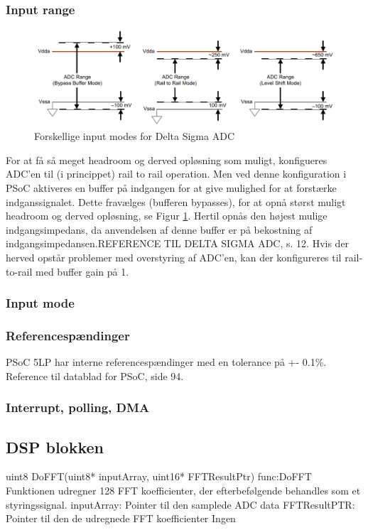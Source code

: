\subsubsection{Input range}
\begin{figure}
    \centering
    \includegraphics{figs/Design/Styringsenhed/inputrange.PNG}
    \caption{Forskellige input modes for Delta Sigma ADC}
    \label{fig:ADC_inputrange}
\end{figure}
For at få så meget headroom og derved opløsning som muligt, konfigueres ADC'en til (i princippet) rail to rail operation. Men ved denne konfiguration i PSoC aktiveres en buffer på indgangen for at give mulighed for at forstærke indganssignalet. Dette fravælges (bufferen bypasses), for at opnå størst muligt headroom og derved opløsning, se Figur \ref{fig:ADC_inputrange}. Hertil opnås den højest mulige indgangsimpedans,  da anvendelsen af denne buffer er på bekostning af indgangsimpedansen.\tbr REFERENCE TIL DELTA SIGMA ADC, s. 12. Hvis der herved opstår problemer med overstyring af ADC'en, kan der konfigureres til rail-to-rail med buffer gain på 1. 

\subsubsection{Input mode}
\subsubsection{Referencespændinger}
PSoC 5LP har interne referencespændinger med en tolerance på +- 0.1\%. \tbr Reference til datablad for PSoC, side 94.



\subsubsection{Interrupt, polling, DMA}





\subsection{DSP blokken}

\begin{functionDescription}
    {uint8 DoFFT(uint8* inputArray, uint16* FFTResultPtr)}
    {func:DoFFT}
    {Funktionen udregner 128 FFT koefficienter, der efterbefølgende behandles som et styringssignal. }
    {inputArray: Pointer til den samplede ADC data\newline
    FFTResultPTR: Pointer til den de udregnede FFT koefficienter}
    {Ingen}
\end{functionDescription}